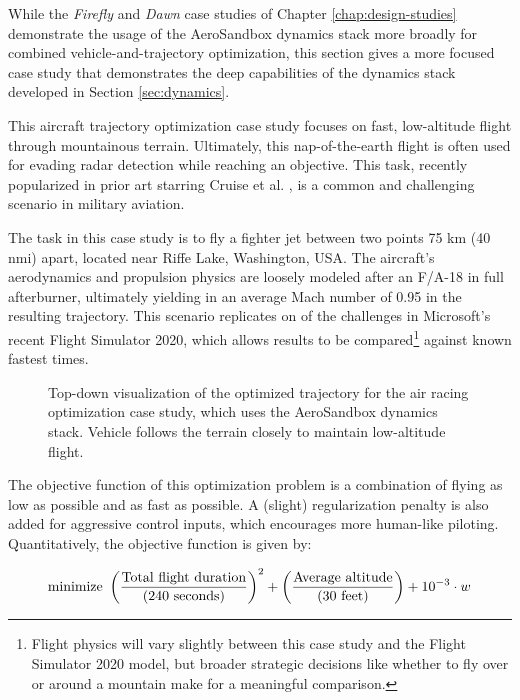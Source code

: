 While the \emph{Firefly} and \emph{Dawn} case studies of Chapter \ref{chap:design-studies} demonstrate the usage of the AeroSandbox dynamics stack more broadly for combined vehicle-and-trajectory optimization, this section gives a more focused case study that demonstrates the deep capabilities of the dynamics stack developed in Section \ref{sec:dynamics}.

This aircraft trajectory optimization case study focuses on fast, low-altitude flight through mountainous terrain. Ultimately, this nap-of-the-earth flight is often used for evading radar detection while reaching an objective. This task, recently popularized in prior art starring Cruise et al. \cite{topgunmaverick2022}, is a common and challenging scenario in military aviation.

The task in this case study is to fly a fighter jet between two points 75 km (40 nmi) apart, located near Riffe Lake, Washington, USA. The aircraft's aerodynamics and propulsion physics are loosely modeled after an F/A-18 in full afterburner, ultimately yielding in an average Mach number of 0.95 in the resulting trajectory. This scenario replicates on of the challenges in Microsoft's recent Flight Simulator 2020, which allows results to be compared\footnote{Flight physics will vary slightly between this case study and the Flight Simulator 2020 model, but broader strategic decisions like whether to fly over or around a mountain make for a meaningful comparison.} against known fastest times.

\begin{figure}[h]
    \centering
    
    \caption{Top-down visualization of the optimized trajectory for the air racing optimization case study, which uses the AeroSandbox dynamics stack. Vehicle follows the terrain closely to maintain low-altitude flight.}
    \label{fig:air-racing-trajectory}
\end{figure}

The objective function of this optimization problem is a combination of flying as low as possible and as fast as possible. A (slight) regularization penalty is also added for aggressive control inputs, which encourages more human-like piloting. Quantitatively, the objective function is given by:

\begin{equation}
    \text{minimize }
    \left(
    \frac
    {\text{Total flight duration}}
    {({240\ \rm seconds})}
    \right)^2 +
    \left(
    \frac
    {\text{Average altitude}}
    {({30\ \rm feet})}
    \right) +
    10^{-3} \cdot w
\end{equation}


